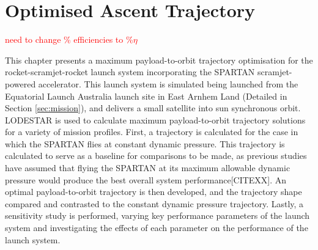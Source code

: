 
\cleardoublepage
\chapter{Optimised Ascent Trajectory}\label{chapter:Ascent}
\textcolor{red}{need to change \% efficiencies to \%$\eta$}

This chapter presents a maximum payload-to-orbit trajectory optimisation for the rocket-scramjet-rocket launch system incorporating the SPARTAN scramjet-powered accelerator. 
This launch system is simulated being launched from the Equatorial Launch Australia launch site in East Arnhem Land (Detailed in Section \ref{sec:mission}), and delivers a small satellite into sun synchronous orbit. LODESTAR is used to calculate maximum payload-to-orbit trajectory solutions for a variety of mission profiles.
First, a trajectory is calculated for the case in which the SPARTAN flies at constant dynamic pressure. This trajectory is calculated to serve as a baseline for comparisons to be made, as previous studies have assumed that flying the SPARTAN at its maximum allowable dynamic pressure would produce the best overall system performance[CITEXX]. An optimal payload-to-orbit trajectory is then developed, and the trajectory shape compared and contrasted to the constant dynamic pressure trajectory.
Lastly, a sensitivity study is performed, varying key performance parameters of the launch system and investigating the effects of each parameter on the performance of the launch system. 

